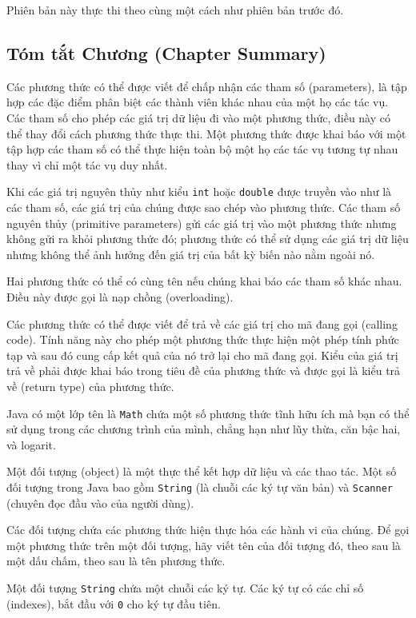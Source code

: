 Phiên bản này thực thi theo cùng một cách như phiên bản trước đó.

\subsection{Tóm tắt Chương (Chapter
Summary)}\label{tuxf3m-tux1eaft-chux1b0ux1a1ng-chapter-summary}

Các phương thức có thể được viết để chấp nhận các tham số (parameters),
là tập hợp các đặc điểm phân biệt các thành viên khác nhau của một họ
các tác vụ. Các tham số cho phép các giá trị dữ liệu đi vào một phương
thức, điều này có thể thay đổi cách phương thức thực thi. Một phương
thức được khai báo với một tập hợp các tham số có thể thực hiện toàn bộ
một họ các tác vụ tương tự nhau thay vì chỉ một tác vụ duy nhất.

Khi các giá trị nguyên thủy như kiểu \texttt{int} hoặc \texttt{double}
được truyền vào như là các tham số, các giá trị của chúng được sao chép
vào phương thức. Các tham số nguyên thủy (primitive parameters) gửi các
giá trị vào một phương thức nhưng không gửi ra khỏi phương thức đó;
phương thức có thể sử dụng các giá trị dữ liệu nhưng không thể ảnh hưởng
đến giá trị của bất kỳ biến nào nằm ngoài nó.

Hai phương thức có thể có cùng tên nếu chúng khai báo các tham số khác
nhau. Điều này được gọi là nạp chồng (overloading).

Các phương thức có thể được viết để trả về các giá trị cho mã đang gọi
(calling code). Tính năng này cho phép một phương thức thực hiện một
phép tính phức tạp và sau đó cung cấp kết quả của nó trở lại cho mã đang
gọi. Kiểu của giá trị trả về phải được khai báo trong tiêu đề của phương
thức và được gọi là kiểu trả về (return type) của phương thức.

Java có một lớp tên là \texttt{Math} chứa một số phương thức tĩnh hữu
ích mà bạn có thể sử dụng trong các chương trình của mình, chẳng hạn như
lũy thừa, căn bậc hai, và logarit.

Một đối tượng (object) là một thực thể kết hợp dữ liệu và các thao tác.
Một số đối tượng trong Java bao gồm \texttt{String} (là chuỗi các ký tự
văn bản) và \texttt{Scanner} (chuyên đọc đầu vào của người dùng).

Các đối tượng chứa các phương thức hiện thực hóa các hành vi của chúng.
Để gọi một phương thức trên một đối tượng, hãy viết tên của đối tượng
đó, theo sau là một dấu chấm, theo sau là tên phương thức.

Một đối tượng \texttt{String} chứa một chuỗi các ký tự. Các ký tự có các
chỉ số (indexes), bắt đầu với \texttt{0} cho ký tự đầu tiên.

